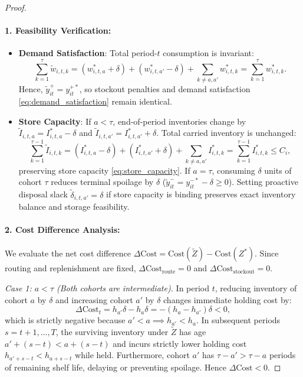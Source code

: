 \documentclass[11pt,a4paper]{article}
\theoremstyle{definition}
\theoremstyle{remark}
\begin{document}
\begin{proof}
\paragraph{1. Feasibility Verification:}
\begin{itemize}[leftmargin=*]
    \item \textbf{Demand Satisfaction}: Total period-$t$ consumption is invariant:
    \begin{equation*}
        \sum_{k=1}^\tau \tilde{w}_{i,t,k} = (w_{i,t,a}^* + \delta) + (w_{i,t,a'}^* - \delta) + \sum_{k \neq a, a'} w_{i,t,k}^* = \sum_{k=1}^\tau w_{i,t,k}^*.
    \end{equation*}
    Hence, $\tilde{y}_{it}^+ = y_{it}^{+*}$, so stockout penalties and demand satisfaction \eqref{eq:demand_satisfaction} remain identical.
    \item \textbf{Store Capacity}: If $a < \tau$, end-of-period inventories change by $\tilde{I}_{i,t,a} = I_{i,t,a}^* - \delta$ and $\tilde{I}_{i,t,a'} = I_{i,t,a'}^* + \delta$. Total carried inventory is unchanged:
    \begin{equation*}
        \sum_{k=1}^{\tau-1} \tilde{I}_{i,t,k} = (I_{i,t,a}^* - \delta) + (I_{i,t,a'}^* + \delta) + \sum_{k \neq a, a'} I_{i,t,k}^* = \sum_{k=1}^{\tau-1} I_{i,t,k}^* \le C_i,
    \end{equation*}
    preserving store capacity \eqref{eq:store_capacity}. If $a = \tau$, consuming $\delta$ units of cohort $\tau$ reduces terminal spoilage by $\delta$ ($\tilde{y}_{it}^- = y_{it}^{-*} - \delta \ge 0$). Setting proactive disposal slack $\tilde{\delta}_{i,t,a'} = \delta$ if store capacity is binding preserves exact inventory balance and storage feasibility.
\end{itemize}

\paragraph{2. Cost Difference Analysis:}
We evaluate the net cost difference $\Delta \text{Cost} = \text{Cost}(\tilde{Z}) - \text{Cost}(Z^*)$. Since routing and replenishment are fixed, $\Delta \text{Cost}_{\text{route}} = 0$ and $\Delta \text{Cost}_{\text{stockout}} = 0$.

\textit{Case 1: $a < \tau$ (Both cohorts are intermediate).}
In period $t$, reducing inventory of cohort $a$ by $\delta$ and increasing cohort $a'$ by $\delta$ changes immediate holding cost by:
\begin{equation*}
    \Delta \text{Cost}_t = h_{a'} \delta - h_a \delta = -(h_a - h_{a'}) \delta < 0,
\end{equation*}
which is strictly negative because $a' < a \implies h_{a'} < h_a$. In subsequent periods $s = t + 1, \dots, T$, the surviving inventory under $\tilde{Z}$ has age $a' + (s - t) < a + (s - t)$ and incurs strictly lower holding cost $h_{a' + s - t} < h_{a + s - t}$ while held. Furthermore, cohort $a'$ has $\tau - a' > \tau - a$ periods of remaining shelf life, delaying or preventing spoilage. Hence $\Delta \text{Cost} < 0$.


\end{proof}
\end{document}
